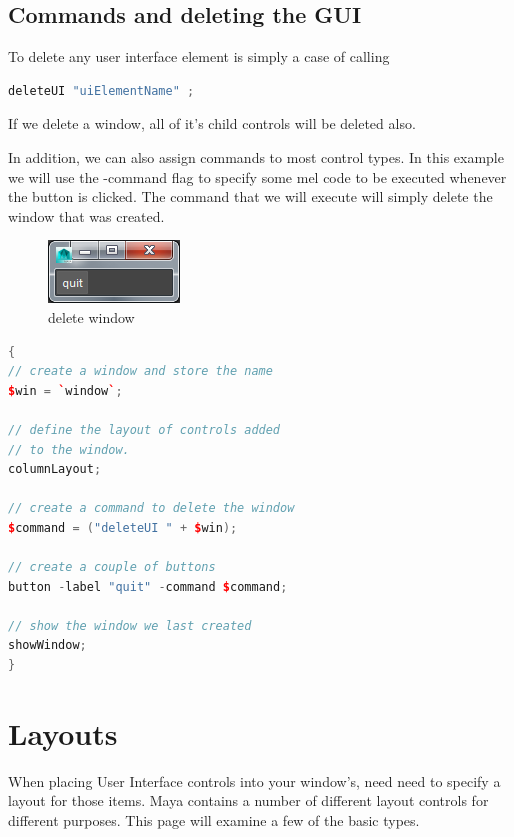 \subsection{Commands and deleting the GUI}
To delete any user interface element is simply a case of calling

\begin{lstlisting}[language = C++]
deleteUI "uiElementName" ;
\end{lstlisting}

If we delete a window, all of it's child controls will be deleted also.

In addition, we can also assign commands to most control types. In this example we will use the -command flag to specify some mel code to be executed whenever the button is clicked. The command that we will execute will simply delete the window that was created.

\begin{figure}[tbh]
	\centering
	\includegraphics[width=0.2\linewidth]{figures/GUI/delete_window}
	\caption{delete window}
	\label{fig:deletewindow}
\end{figure}


\begin{lstlisting}[language = C++]
{
// create a window and store the name
$win = `window`;

// define the layout of controls added 
// to the window.
columnLayout;

// create a command to delete the window
$command = ("deleteUI " + $win);

// create a couple of buttons
button -label "quit" -command $command;

// show the window we last created
showWindow;
}
\end{lstlisting}

\section{Layouts}
When placing User Interface controls into your window's, need need to specify a layout for those items. Maya contains a number of different layout controls for different purposes. This page will examine a few of the basic types.

